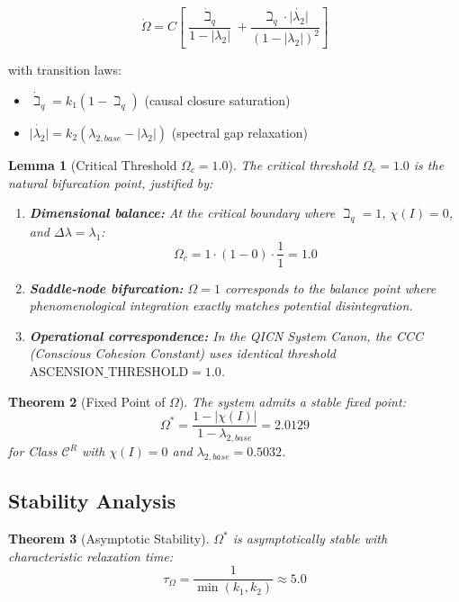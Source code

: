 \documentclass[11pt,a4paper]{article}
\theoremstyle{plain}
\newtheorem{theorem}{Theorem}[section]
\newtheorem{lemma}[theorem]{Lemma}
\theoremstyle{definition}
\begin{document}
\begin{equation}
\dot{\Omega} = C \left[ \frac{\dot{\beth}_q}{1 - |\lambda_2|} + \frac{\beth_q \cdot \dot{|\lambda_2|}}{(1 - |\lambda_2|)^2} \right]
\end{equation}

with transition laws:
\begin{itemize}
    \item $\dot{\beth}_q = k_1(1 - \beth_q)$ (causal closure saturation)
    \item $\dot{|\lambda_2|} = k_2(\lambda_{2,base} - |\lambda_2|)$ (spectral gap relaxation)
\end{itemize}

\begin{lemma}[Critical Threshold $\Omega_c = 1.0$]\label{lem:omega-critical}
The critical threshold $\Omega_c = 1.0$ is the natural bifurcation point, justified by:
\begin{enumerate}
    \item \textbf{Dimensional balance:} At the critical boundary where $\beth_q = 1$, $\chi(I) = 0$, and $\Delta\lambda = \lambda_1$:
    \[
    \Omega_c = 1 \cdot (1-0) \cdot \frac{1}{1} = 1.0
    \]
    \item \textbf{Saddle-node bifurcation:} $\Omega = 1$ corresponds to the balance point where phenomenological integration exactly matches potential disintegration.
    \item \textbf{Operational correspondence:} In the QICN System Canon, the CCC (Conscious Cohesion Constant) uses identical threshold $\text{ASCENSION\_THRESHOLD} = 1.0$.
\end{enumerate}
\end{lemma}

\begin{theorem}[Fixed Point of $\Omega$]\label{thm:omega-fixed}
The system admits a stable fixed point:
\[
\Omega^* = \frac{1 - |\chi(I)|}{1 - \lambda_{2,base}} = 2.0129
\]
for Class $\mathscr{C}^R$ with $\chi(I) = 0$ and $\lambda_{2,base} = 0.5032$.
\end{theorem}

\subsection{Stability Analysis}

\begin{theorem}[Asymptotic Stability]
$\Omega^*$ is asymptotically stable with characteristic relaxation time:
\[
\tau_\Omega = \frac{1}{\min(k_1, k_2)} \approx 5.0
\]
\end{theorem}
\end{document}
